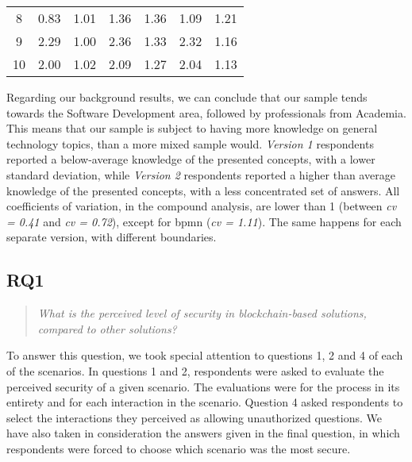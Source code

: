\begin{table}[htb]
\begin{tabular}{c|cccc|cc}
		8           & 0.83                              & 1.01                                     & 1.36                         & 1.36         & 1.09        & 1.21         \\
		9           & 2.29                              & 1.00                                     & 2.36                         & 1.33         & 2.32        & 1.16         \\
		10          & 2.00                              & 1.02                                     & 2.09                         & 1.27         & 2.04        & 1.13         \\
		\hline
	\end{tabular}
\end{table}

Regarding our background results, we can conclude that our sample tends towards the Software Development area, followed by professionals from Academia. This means that our sample is subject to having more knowledge on general technology topics, than a more mixed sample would. \textit{Version 1} respondents reported a below-average knowledge of the presented concepts, with a lower standard deviation, while \textit{Version 2} respondents reported a higher than average knowledge of the presented concepts, with a less concentrated set of answers. All coefficients of variation, in the compound analysis, are lower than 1 (between \textit{cv = 0.41} and \textit{cv = 0.72}), except for \gls{bpmn} (\textit{cv = 1.11}). The same happens for each separate version, with different boundaries.

\subsection{RQ1}

\begin{quote}
	\textit{What is the perceived level of security in blockchain-based solutions, compared to other solutions?}
\end{quote}

To answer this question, we took special attention to questions 1, 2 and 4 of each of the scenarios. In questions 1 and 2, respondents were asked to evaluate the perceived security of a given scenario. The evaluations were for the process in its entirety and for each interaction in the scenario. Question 4 asked respondents to select the interactions they perceived as allowing unauthorized questions. We have also taken in consideration the answers given in the final question, in which respondents were forced to choose which scenario was the most secure.

